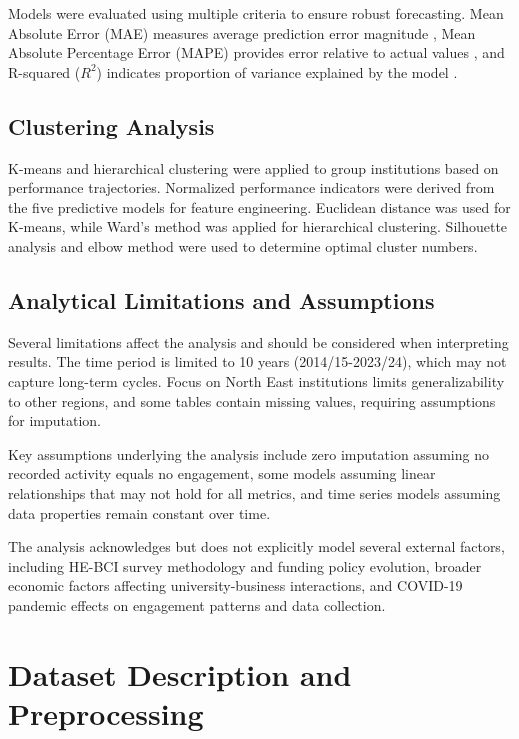 \documentclass[journal,onecolumn, 10pt,draftclsnofoot]{IEEEtran}
\begin{document}
Models were evaluated using multiple criteria to ensure robust forecasting. Mean Absolute Error (MAE) measures average prediction error magnitude \cite{hyndman2006another}, Mean Absolute Percentage Error (MAPE) provides error relative to actual values \cite{hyndman2006another}, and R-squared ($R^2$) indicates proportion of variance explained by the model \cite{hyndman2006another}.

\subsection{Clustering Analysis}

K-means and hierarchical clustering \cite{macqueen1967methods,ward1963hierarchical} were applied to group institutions based on performance trajectories. Normalized performance indicators were derived from the five predictive models for feature engineering. Euclidean distance was used for K-means, while Ward's method was applied for hierarchical clustering. Silhouette analysis \cite{rousseeuw1987silhouettes} and elbow method \cite{thorndike1953belongs} were used to determine optimal cluster numbers.

\subsection{Analytical Limitations and Assumptions}

Several limitations affect the analysis and should be considered when interpreting results. The time period is limited to 10 years (2014/15-2023/24), which may not capture long-term cycles. Focus on North East institutions limits generalizability to other regions, and some tables contain missing values, requiring assumptions for imputation.

Key assumptions underlying the analysis include zero imputation assuming no recorded activity equals no engagement, some models assuming linear relationships that may not hold for all metrics, and time series models assuming data properties remain constant over time.

The analysis acknowledges but does not explicitly model several external factors, including HE-BCI survey methodology and funding policy evolution, broader economic factors affecting university-business interactions, and COVID-19 pandemic effects on engagement patterns and data collection.

\section{Dataset Description and Preprocessing}
\end{document}
